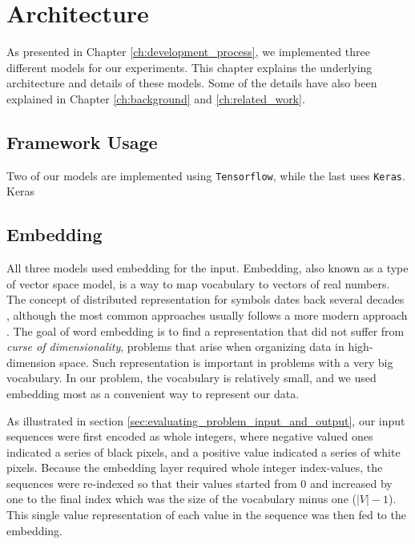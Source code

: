 
\chapter{Architecture}
\label{ch:architecture}
As presented in Chapter \ref{ch:development_process}, we implemented three different models for our experiments. This chapter explains the underlying architecture and details of these models. Some of the details have also been explained in Chapter \ref{ch:background} and \ref{ch:related_work}.


\section{Framework Usage}
Two of our models are implemented using {\tt Tensorflow}, while the last uses {\tt Keras}. Keras


\section{Embedding}
All three models used embedding for the input. Embedding, also known as a type of vector space model, is a way to map vocabulary to vectors of real numbers. The concept of distributed representation for symbols dates back several decades \citep{hinton1986learning}, although the most common approaches usually follows a more modern approach \citep{bengio2003neural}. The goal of word embedding is to find a representation that did not suffer from \emph{curse of dimensionality}, problems that arise when organizing data in high-dimension space. Such representation is important in problems with a very big vocabulary. In our problem, the vocabulary is relatively small, and we used embedding most as a convenient way to represent our data.

As illustrated in section \ref{sec:evaluating_problem_input_and_output}, our input sequences were first encoded as whole integers, where negative valued ones indicated a series of black pixels, and a positive value indicated a series of white pixels. Because the embedding layer required whole integer index-values, the sequences were re-indexed so that their values started from \(0\) and increased by one to the final index which was the size of the vocabulary minus one (\(|V| - 1\)). This single value representation of each value in the sequence was then fed to the embedding. 

